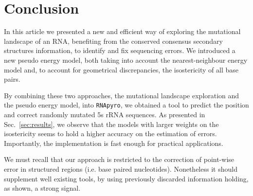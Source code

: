 \section{Conclusion}
\label{sec:conclusion}

In this article we presented a new and efficient way of
exploring the mutational landscape of an RNA, benefiting from the
 conserved consensus secondary structures  information,
to identify and fix sequencing errors. We introduced a new
 pseudo energy model, both taking into account the nearest-neighbour energy model 
and, to account for geometrical discrepancies,  the isostericity of all base pairs. 

By combining these two approaches,  the 
mutational landscape exploration and the pseudo energy model,
 into \texttt{RNApyro}, we obtained a tool to predict the position and 
correct randomly mutated 5s rRNA sequences. 
As presented in Sec.~\ref{sec:results},
we observe that the models
with larger weights on the
isostericity seems to hold a higher accuracy on the estimation of errors.
Importantly, the implementation is fast enough for practical applications.

We must recall that our approach is restricted to
 the correction of point-wise error in structured regions (i.e. base paired nucleotides).
 Nonetheless it should supplement well existing tools, by using previously discarded
information holding, as shown, a strong signal.


